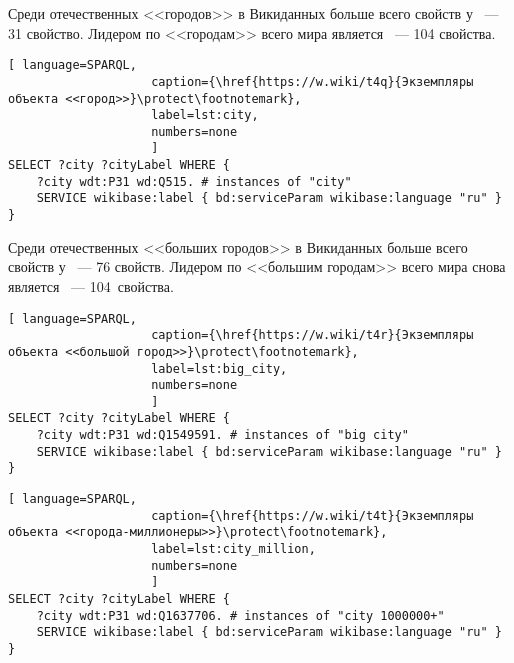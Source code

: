 Среди отечественных <<городов>> в Викиданных больше всего свойств 
у ~--- 31 свойство\autocite{city_prowd}. 
Лидером по <<городам>> всего мира является ~--- 104 свойства.

\begin{lstlisting}[ language=SPARQL, 
                    caption={\href{https://w.wiki/t4q}{Экземпляры объекта <<город>>}\protect\footnotemark},
                    label=lst:city,
                    numbers=none
                    ]
SELECT ?city ?cityLabel WHERE {
	?city wdt:P31 wd:Q515. # instances of "city"
	SERVICE wikibase:label { bd:serviceParam wikibase:language "ru" }
}
\end{lstlisting}

Среди отечественных <<больших городов>> в Викиданных больше всего свойств 
у ~--- 76 свойств\autocite{big_city_prowd}. 
Лидером по <<большим городам>> всего мира снова является ~--- 104~свойства.

\begin{lstlisting}[ language=SPARQL, 
                    caption={\href{https://w.wiki/t4r}{Экземпляры объекта <<большой город>>}\protect\footnotemark},
                    label=lst:big_city,
                    numbers=none
                    ]
SELECT ?city ?cityLabel WHERE {
	?city wdt:P31 wd:Q1549591. # instances of "big city"    
	SERVICE wikibase:label { bd:serviceParam wikibase:language "ru" }
}
\end{lstlisting}




\newpage
\begin{lstlisting}[ language=SPARQL, 
                    caption={\href{https://w.wiki/t4t}{Экземпляры объекта <<города-миллионеры>>}\protect\footnotemark},
                    label=lst:city_million,
                    numbers=none
                    ]
SELECT ?city ?cityLabel WHERE {
	?city wdt:P31 wd:Q1637706. # instances of "city 1000000+" 
	SERVICE wikibase:label { bd:serviceParam wikibase:language "ru" }
}
\end{lstlisting}


